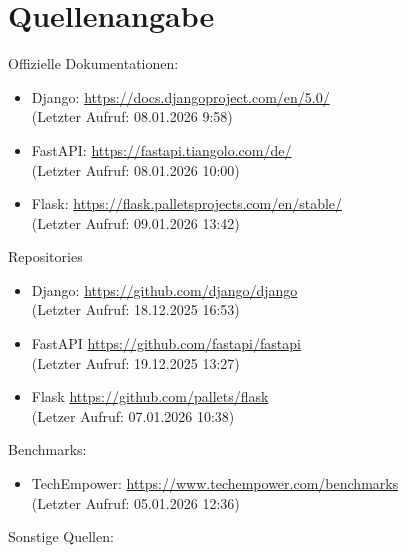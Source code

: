 \documentclass[letterpaper,11pt,leqno]{article}
\begin{document}
\section{Quellenangabe}
Offizielle Dokumentationen:
\begin{itemize}
	\item Django: \url{https://docs.djangoproject.com/en/5.0/}\\(Letzter Aufruf: 08.01.2026 9:58)
	\item FastAPI: \url{https://fastapi.tiangolo.com/de/}\\(Letzter Aufruf: 08.01.2026 10:00)
	\item Flask: \url{https://flask.palletsprojects.com/en/stable/}\\(Letzter Aufruf: 09.01.2026 13:42)
\end{itemize}
Repositories
\begin{itemize}
	\item Django: \url{https://github.com/django/django}\\(Letzter Aufruf: 18.12.2025 16:53)
	\item FastAPI \url{https://github.com/fastapi/fastapi}\\(Letzter Aufruf: 19.12.2025 13:27)
	\item Flask \url{https://github.com/pallets/flask}\\(Letzer Aufruf: 07.01.2026 10:38)
\end{itemize}
Benchmarks:
\begin{itemize}
	\item TechEmpower: \url{https://www.techempower.com/benchmarks}\\(Letzter Aufruf: 05.01.2026 12:36)
\end{itemize}
Sonstige Quellen:
\end{document}
